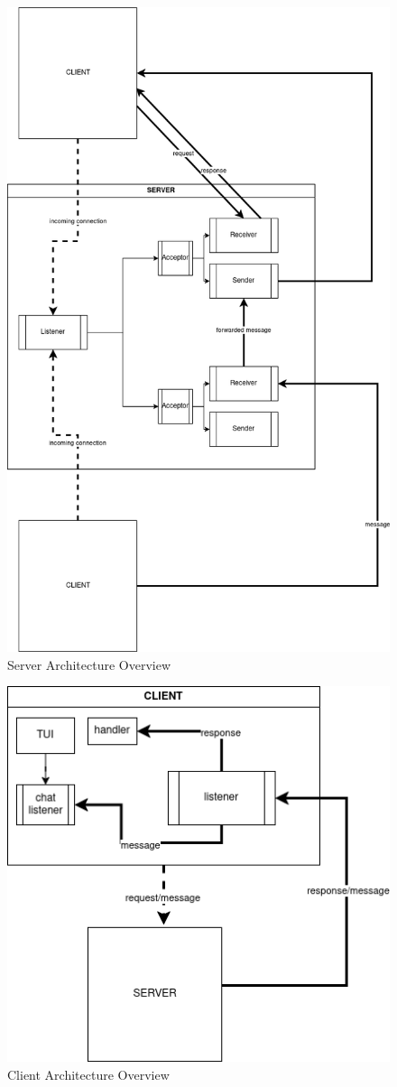 \begin{figure}
  \centering
  \includegraphics[width=0.8\linewidth]{imgs/server-arch.png}
  \caption{Server Architecture Overview}
  \label{fig:architecture-overview}
\end{figure}



\begin{figure}
  \centering
  \includegraphics[width=0.8\linewidth]{imgs/client-arch.png}
  \caption{Client Architecture Overview}
  \label{fig:client-architecture-overview}
\end{figure}


